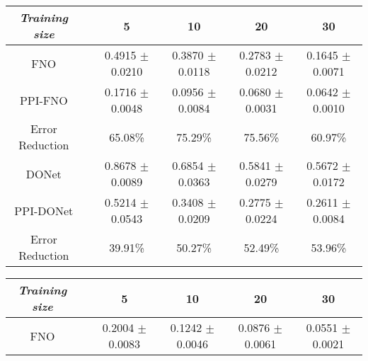 \begin{table*}[htbp!]
\caption{\small Relative $L_2$ error in five operator learning benchmarks, where ``PPI'' is short for ``Pseudo-Physics Informed''. The results were averaged from five runs.  } \label{tb:all-pred-error}
    \small
    \centering
    \begin{subtable}{\textwidth}
    \caption{\small \textit{Darcy flow}}
    \label{tab:darcy}
        \small 
        \centering
    \begin{tabular}{cccccc}
        \hline
        \textit{Training size}      &  & {5}             & {10}         & {20}     & {30}     \\ \hline
        FNO                  &  & 0.4915 $\pm$ 0.0210	& 0.3870 $\pm$ 0.0118   & 0.2783 $\pm$ 0.0212   & 0.1645 $\pm$ 0.0071         \\
        PPI-FNO          &  & {0.1716} $\pm$ {0.0048}          & {0.0956} $\pm$ {0.0084}        & {0.0680} $\pm$ {0.0031} 		 & {0.0642} $\pm$ {0.0010}    \\
        Error Reduction          &  & 65.08\% & 75.29\%        & 75.56\%		 & 60.97\%   \\ \hline
        DONet             &  & 0.8678 $\pm$ 0.0089          & 0.6854 $\pm$ 0.0363      & 0.5841 $\pm$ 0.0279 	& 0.5672 $\pm$ 0.0172    \\
        PPI-DONet             &  & 0.5214 $\pm$ 0.0543        & 0.3408 $\pm$ 0.0209    	& 0.2775 $\pm$ 0.0224	& 0.2611 $\pm$ 0.0084  \\ 
        Error Reduction  &  & 39.91\%         & 50.27\%    	& 52.49\%	& 53.96\%  \\ \hline
    \end{tabular}
    \end{subtable}
    \begin{subtable}{\textwidth}
    \caption{\small \textit{Nonlinear diffusion}}
        \small
        \centering
        \begin{tabular}{cccccc}
        \hline
        \textit{Training size}      &  & {5}             & {10}         & {20}     & {30}     \\ \hline
        FNO                  &  & 0.2004 $\pm$ 0.0083	& 0.1242 $\pm$ 0.0046   & 0.0876 $\pm$ 0.0061   & 0.0551 $\pm$ 0.0021         \\

\end{tabular}
\end{subtable}
\end{table*}
